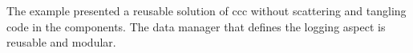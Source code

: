 The example presented a reusable solution of \ac{ccc} without scattering and tangling code in the components.
The data manager that defines the logging aspect is reusable and modular.







